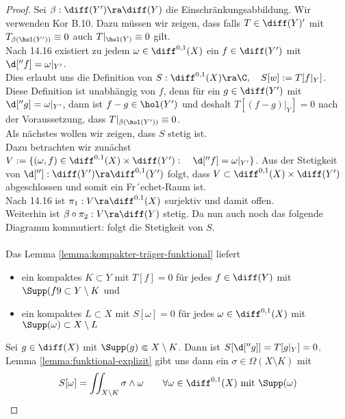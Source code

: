 \begin{proof}
  Sei $\beta: \diff(Y') \ra \diff(Y)$ die Einschränkungsabbildung. Wir
  verwenden Kor B.10. Dazu müssen wir zeigen, dass falls $T \in
  \diff(Y)'$ mit $T_{\beta(\hol(Y'))} \equiv 0$ auch $T|_{\hol(Y)}
  \equiv 0$ gilt. \\
  Nach 14.16 existiert zu jedem $\omega \in \diff^{0,1}(X)$ ein $f \in
  \diff(Y')$ mit $\d[''f] = \omega|_{Y'}$. \\
  Dies erlaubt uns die Definition von $S: \diff^{0,1}(X) \ra \C, \quad
  S[w] := T[f|_Y]$. Diese Definition ist unabhängig von $f$, denn für
  ein $g \in \diff(Y')$ mit $\d[''g] = \omega|_{Y'}$, dann ist $f-g
  \in \hol(Y')$ und deshalt $T[(f-g)|_Y] = 0$ nach der Voraussetzung,
  dass $T|_{\beta(\hol(Y'))} \equiv 0$. \\
  Als nächstes wollen wir zeigen, dass $S$ stetig ist. \\
  Dazu betrachten wir zunächst $V := \{ (\omega, f) \in \diff^{0,1}(X)
  \times \diff(Y'): \quad \d[''f] = \omega|_{Y'} \}$. Aus der
  Stetigkeit von $\d['']: \diff(Y') \ra \diff^{0,1}(Y')$ folgt, dass $V
  \subset \diff^{0,1}(X) \times \diff(Y')$ abgeschlossen und somit ein
  Fr´echet-Raum ist. \\
  Nach 14.16 ist $\pi_1: V \ra \diff^{0,1}(X)$ surjektiv und damit
  offen. \\
  Weiterhin ist $\beta \circ \pi_2 : V \ra \diff(Y)$ stetig. Da nun
  auch noch das folgende Diagramm kommutiert:
  folgt die Stetigkeit von $S$. \\
  \\
  Das Lemma \ref{lemma:kompakter-träger-funktional} liefert
  \begin{itemize}
  \item ein kompaktes $K \subset Y$ mit $T[f] = 0$ für jedes $f \in
    \diff(Y)$ mit $\Supp(f9 \subset Y \setminus K$ und
  \item ein kompaktes $L \subset X$ mit $S[\omega] = 0$ für jedes
    $\omega \in \diff^{0,1}(X)$ mit $\Supp(\omega) \subset X\setminus L$
  \end{itemize}
   Sei $g \in \diff(X)$ mit $\Supp(g) \Subset X \setminus K$. Dann ist
   $S[\d[''g]] = T[g|_Y]  = 0$. Lemma \ref{lemma:funktional-explizit}
   gibt uns dann ein $\sigma \in \Omega(X\setminus K)$ mit
   \[
   S[\omega] = \iint_{X \setminus K}\sigma \wedge \omega \qquad
   \forall \omega \in \diff^{0,1}(X) \text{ mit } \Supp(\omega)
\]
\end{proof}
